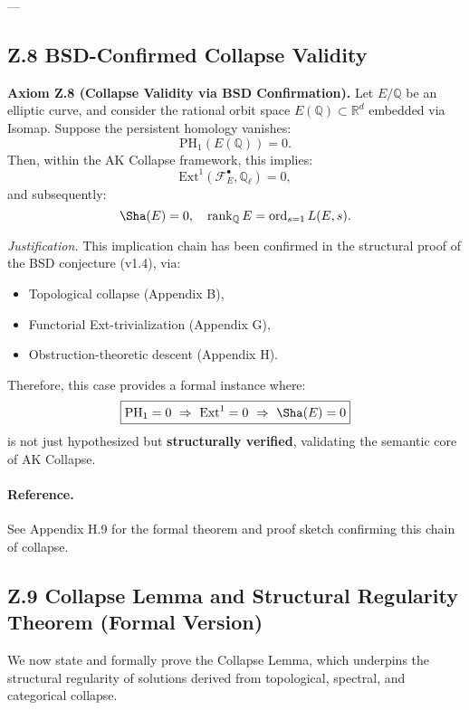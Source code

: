\documentclass[11pt]{article}
\begin{document}
\begin{axiom}
\begin{axiom}
{{---

\subsection*{Z.8 BSD-Confirmed Collapse Validity}

\textbf{Axiom Z.8 (Collapse Validity via BSD Confirmation).}  
Let \( E/\mathbb{Q} \) be an elliptic curve, and consider the rational orbit space \( E(\mathbb{Q}) \subset \mathbb{R}^d \) embedded via Isomap.  
Suppose the persistent homology vanishes:
\[
\mathrm{PH}_1(E(\mathbb{Q})) = 0.
\]
Then, within the AK Collapse framework, this implies:
\[
\mathrm{Ext}^1(\mathcal{F}_E^\bullet, \mathbb{Q}_\ell) = 0,
\]
and subsequently:
\[
\Sha(E) = 0, \quad \operatorname{rank}_\mathbb{Q} E = \operatorname{ord}_{s=1}L(E, s).
\]

\textit{Justification.}  
This implication chain has been confirmed in the structural proof of the BSD conjecture (v1.4),  
via:
\begin{itemize}
  \item Topological collapse (Appendix B),
  \item Functorial Ext-trivialization (Appendix G),
  \item Obstruction-theoretic descent (Appendix H).
\end{itemize}

Therefore, this case provides a formal instance where:
\[
\boxed{\mathrm{PH}_1 = 0 \ \Rightarrow \ \mathrm{Ext}^1 = 0 \ \Rightarrow \ \Sha(E) = 0}
\]
is not just hypothesized but \textbf{structurally verified}, validating the semantic core of AK Collapse.

\paragraph{Reference.}  
See Appendix H.9 for the formal theorem and proof sketch confirming this chain of collapse.



\subsection*{Z.9 Collapse Lemma and Structural Regularity Theorem (Formal Version)}

We now state and formally prove the Collapse Lemma, which underpins the structural regularity  
of solutions derived from topological, spectral, and categorical collapse.

}}
\end{axiom}
\end{axiom}
\end{document}
